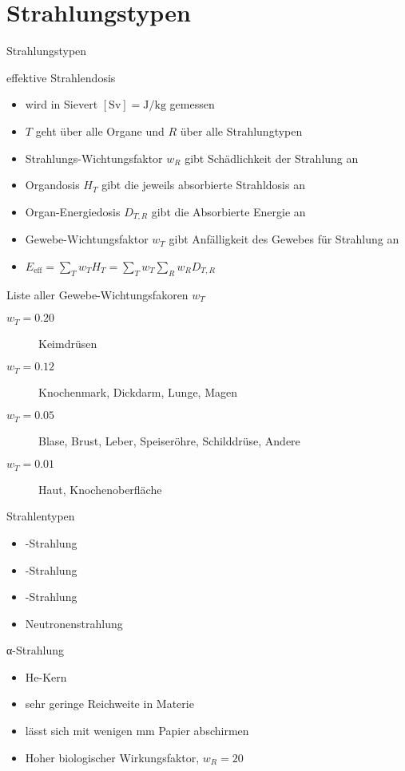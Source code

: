 \section{Strahlungstypen}
\begin{frame}
	\begin{block}{Strahlungstypen}
	\end{block}
\end{frame}
\begin{frame}{effektive Strahlendosis}
\begin{itemize}
	\item wird in Sievert $[\si{\sievert}]=\si{\joule \per \kilo \gram}$ gemessen
	\item $T$ geht über alle Organe und $R$ über alle Strahlungtypen
	\item Strahlungs-Wichtungsfaktor $w_R$ gibt Schädlichkeit der Strahlung an
	\item Organdosis $H_T$ gibt die jeweils absorbierte Strahldosis an
	\item Organ-Energiedosis $D_{T,R}$ gibt die Absorbierte Energie an
	\item Gewebe-Wichtungsfaktor $w_T$ gibt Anfälligkeit des Gewebes für Strahlung an
	\item $E_\mathrm{eff}=\sum_T w_TH_T =\sum_T w_T \sum_R w_RD_{T,R}$
\end{itemize}
\end{frame}
\begin{frame}{Liste aller Gewebe-Wichtungsfakoren $w_T$}
	\begin{description}
		\item[$w_T=0.20$] Keimdrüsen
		\item[$w_T=0.12$] Knochenmark, Dickdarm, Lunge, Magen
		\item[$w_T=0.05$] Blase, Brust, Leber, Speiseröhre, Schilddrüse, Andere
		\item[$w_T=0.01$] Haut, Knochenoberfläche
	\end{description}
\end{frame}
\begin{frame}{Strahlentypen}
	\begin{itemize}
		\item \alpha-Strahlung
		\item \beta-Strahlung
		\item \gamma-Strahlung
		\item Neutronenstrahlung
	\end{itemize}
\end{frame}
\begin{frame}{α-Strahlung}
	\begin{itemize}
		\item He-Kern
		\item sehr geringe Reichweite in Materie
		\item lässt sich mit wenigen \si{\milli \meter} Papier abschirmen
		\item Hoher biologischer Wirkungsfaktor, $w_R=20$
	\end{itemize}
\end{frame}
